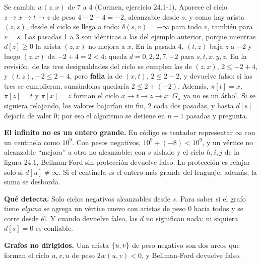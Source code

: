 \documentclass[11pt,letterpaper]{article}
\begin{document}
\begin{ejemplo}
  \label{ej:bellman-ford-ciclo-negativo}
  Se cambia $w(z, x)$ de $7$ a $4$ (Cormen, ejercicio 24.1-1).
  Aparece el ciclo $z \to x \to t \to z$ de peso $4 - 2 - 4 = -2$,
  alcanzable desde $s$, y como hay arista $(z, s)$, desde el ciclo se
  llega a todo: $\delta(s, v) = -\infty$ para todo $v$, también para
  $v = s$. Las pasadas 1 a 3 son idénticas a las del ejemplo
  anterior, porque mientras $d[z] \ge 0$ la arista $(z, x)$ no mejora
  a $x$. En la pasada 4, $(t, z)$ baja $z$ a $-2$ y luego $(z, x)$ da
  $-2 + 4 = 2 < 4$: queda $d = 0, 2, 2, 7, -2$ para $s, t, x, y, z$.
  En la revisión, de las tres desigualdades del ciclo se cumplen las
  de $(z, x)$, $2 \le -2 + 4$, y $(t, z)$, $-2 \le 2 - 4$, pero
  \textbf{falla} la de $(x, t)$, $2 \le 2 - 2$, y devuelve falso: si
  las tres se cumplieran, sumándolas quedaría $2 \le 2 + (-2)$.
  Además, $\pi[t] = x$, $\pi[z] = t$ y $\pi[x] = z$ forman el ciclo
  $x \to t \to z \to x$: $G_\pi$ ya no es un árbol. Si se siguiera
  relajando, los valores bajarían sin fin, $2$ cada dos pasadas, y
  hasta $d[s]$ dejaría de valer $0$; por eso el algoritmo se detiene
  en $n - 1$ pasadas y pregunta.
\end{ejemplo}

\begin{ojo}
  \textbf{El infinito no es un entero grande.} En código es tentador
  representar $\infty$ con un centinela como $10^9$. Con pesos
  negativos, $10^9 + (-8) < 10^9$, y un vértice no alcanzable
  ``mejora'' a otro no alcanzable: con $s$ aislado y el ciclo
  $h, i, j$ de la figura 24.1, Bellman-Ford sin protección devuelve
  falso. La protección es relajar solo si $d[u] \neq \infty$. Si el
  centinela es el entero más grande del lenguaje, además, la suma se
  desborda.

  \smallskip
  \textbf{Qué detecta.} Solo ciclos negativos alcanzables desde $s$.
  Para saber si el grafo tiene \emph{alguno} se agrega un vértice
  nuevo con aristas de peso $0$ hacia todos y se corre desde él. Y
  cuando devuelve falso, las $d$ no significan nada: ni siquiera
  $d[s] = 0$ es confiable.

  \smallskip
  \textbf{Grafos no dirigidos.} Una arista $\left\{ u, v \right\}$ de peso
  negativo son dos arcos que forman el ciclo $u, v, u$ de peso
  $2w(u, v) < 0$, y Bellman-Ford devuelve falso.
\end{ojo}

\end{document}
